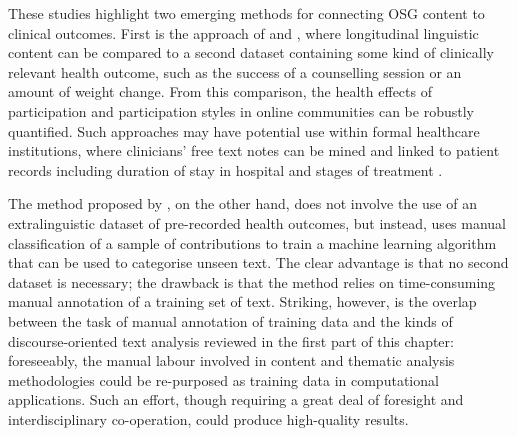 

These studies highlight two emerging methods for connecting \gls{OSG} content to clinical outcomes. First is the approach of \textcite{yan2015good} and \textcite{althoff_counseling_2016}, where longitudinal linguistic content can be compared to a second dataset containing some kind of clinically relevant health outcome, such as the success of a counselling session or an amount of weight change. From this comparison, the health effects of participation and participation styles in online communities can be robustly quantified. Such approaches may have potential use within formal healthcare institutions, where clinicians' free text notes can be mined and linked to patient records including duration of stay in hospital and stages of treatment \cite{elkin_nlp-based_2008,miller_discovering_2013}.

The method proposed by \textcite{maclean_forum77:_2015}, on the other hand, does not involve the use of an extralinguistic dataset of pre\hyp{}recorded health outcomes, but instead, uses manual classification of a sample of contributions to train a machine learning algorithm that can be used to categorise unseen text. The clear advantage is that no second dataset is necessary; the drawback is that the method relies on time\hyp{}consuming manual annotation of a training set of text. Striking, however, is the overlap between the task of manual annotation of training data and the kinds of discourse\hyp{}oriented text analysis reviewed in the first part of this chapter: foreseeably, the manual labour involved in content and thematic analysis methodologies could be re\hyp{}purposed as training data in computational applications. Such an effort, though requiring a great deal of foresight and interdisciplinary co\hyp{}operation, could produce high\hyp{}quality results.




